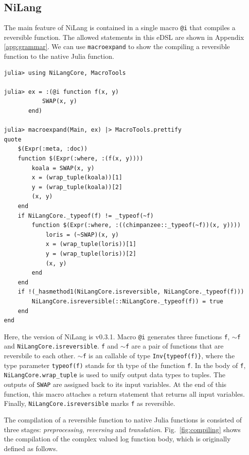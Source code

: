 \documentclass{article}
\newcommand{\<}{\langle}
\renewcommand{\>}{\rangle}
\newcommand{\Fig}[1]{Fig.~\ref{#1}}
\newcommand{\App}[1]{Appendix \ref{#1}}
\theoremstyle{definition}\newtheorem{definition}{\textit{Definition}}
\begin{document}
\subsection{NiLang}
The main feature of NiLang is contained in a single macro \texttt{@i} that compiles a reversible function.
The allowed statements in this eDSL are shown in \App{app:grammar}.
We can use \texttt{macroexpand} to show the compiling a reversible function to the native Julia function.

\begin{minipage}{.88\columnwidth}
\begin{lstlisting}
julia> using NiLangCore, MacroTools

julia> ex = :(@i function f(x, y)
           SWAP(x, y)
       end)

julia> macroexpand(Main, ex) |> MacroTools.prettify
quote
    $(Expr(:meta, :doc))
    function $(Expr(:where, :(f(x, y))))
        koala = SWAP(x, y)
        x = (wrap_tuple(koala))[1]
        y = (wrap_tuple(koala))[2]
        (x, y)
    end
    if NiLangCore._typeof(f) != _typeof(~f)
        function $(Expr(:where, :((chimpanzee::_typeof(~f))(x, y))))
            loris = (~SWAP)(x, y)
            x = (wrap_tuple(loris))[1]
            y = (wrap_tuple(loris))[2]
            (x, y)
        end
    end
    if !(_hasmethod1(NiLangCore.isreversible, NiLangCore._typeof(f)))
        NiLangCore.isreversible(::NiLangCore._typeof(f)) = true
    end
end
\end{lstlisting}
\end{minipage}

Here, the version of NiLang is v0.3.1.
Macro \texttt{@i} generates three functions \texttt{f}, \texttt{$\sim$f} and \texttt{NiLangCore.isreversible}. \texttt{f} and \texttt{$\sim$f} are a pair of functions that are reversbile to each other. \texttt{$\sim$f} is an callable of type \texttt{Inv\{typeof(f)\}}, where the type parameter \texttt{typeof(f)} stands for th type of the function \texttt{f}.
In the body of \texttt{f}, \texttt{NiLangCore.wrap\_tuple} is used to unify output data types to tuples.
The outputs of \texttt{SWAP} are assigned back to its input variables.
At the end of this function, this macro attaches a return statement that returns all input variables.
Finally, \texttt{NiLangCore.isreversible} marks \texttt{f} as reversible.

The compilation of a reversible function to native Julia functions is consisted of three stages: \textit{preprocessing}, \textit{reversing} and \textit{translation}.
\Fig{fig:compiling} shows the compilation of the complex valued log function body, which is originally defined as follows.
\end{document}
